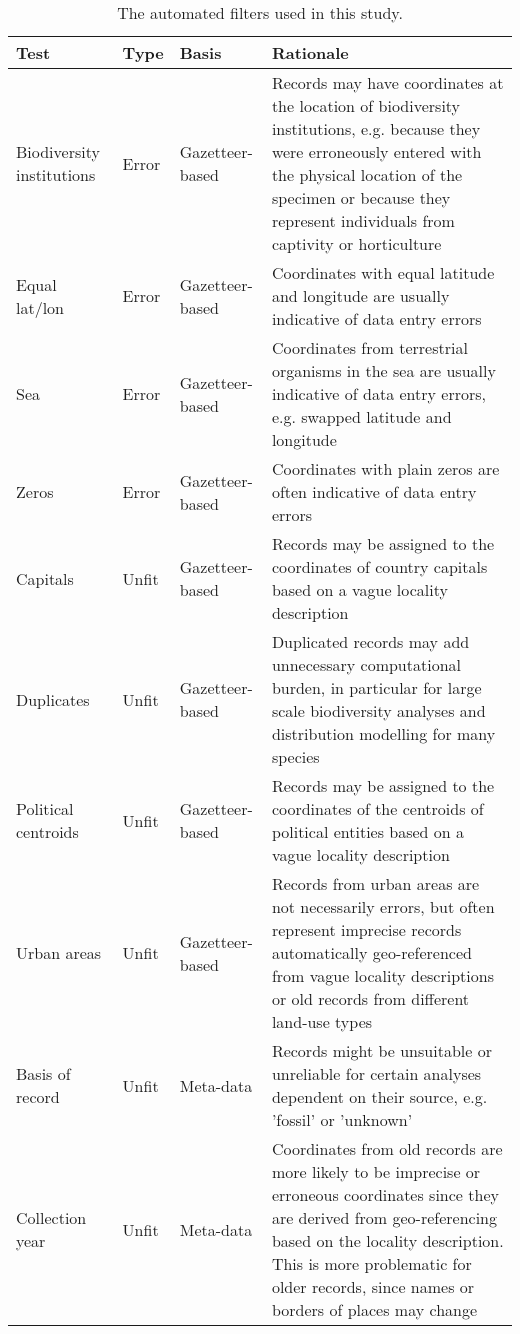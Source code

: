\documentclass[fleqn,10pt,lineno]{wlpeerj} %
\begin{document}
\begin{table}[!h]

\caption{\label{tab:tabletests}The automated filters used in this study.}
\centering
\fontsize{9}{11}\selectfont
\begin{tabular}[t]{>{\raggedright\arraybackslash}p{2cm}>{\raggedright\arraybackslash}p{1cm}>{\raggedright\arraybackslash}p{2.5cm}>{\raggedright\arraybackslash}p{9cm}}
\toprule
Test & Type & Basis & Rationale\\
\midrule
\rowcolor{gray!6}  Biodiversity institutions & Error & Gazetteer-based & Records may have coordinates at the location of biodiversity institutions, e.g. because they were erroneously entered with the physical location of the specimen or because they represent individuals from captivity or horticulture\\
Equal lat/lon & Error & Gazetteer-based & Coordinates with equal latitude and longitude are usually indicative of data entry errors\\
\rowcolor{gray!6}  Sea & Error & Gazetteer-based & Coordinates from terrestrial organisms in the sea are usually indicative of data entry errors, e.g. swapped latitude and longitude\\
Zeros & Error & Gazetteer-based & Coordinates with plain zeros are often indicative of data entry errors\\
\rowcolor{gray!6}  Capitals & Unfit & Gazetteer-based & Records may be assigned to the coordinates of country capitals based on a vague locality description\\
\addlinespace
Duplicates & Unfit & Gazetteer-based & Duplicated records may add unnecessary computational burden, in particular for large scale biodiversity analyses and distribution modelling for many species\\
\rowcolor{gray!6}  Political centroids & Unfit & Gazetteer-based & Records may be assigned to the coordinates of the centroids of political entities based on a vague locality description\\
Urban areas & Unfit & Gazetteer-based & Records from urban areas are not necessarily errors, but often represent imprecise records automatically geo-referenced from vague locality descriptions or old records from different land-use types\\
\rowcolor{gray!6}  Basis of record & Unfit & Meta-data & Records might be unsuitable or unreliable for certain analyses dependent on their source, e.g. 'fossil' or 'unknown'\\
Collection year & Unfit & Meta-data & Coordinates from old records are more likely to be imprecise or erroneous coordinates since they are derived from  geo-referencing based on the locality description. This is more problematic for older records, since names or borders of places may change\\

\end{tabular}
\end{table}
\end{document}
